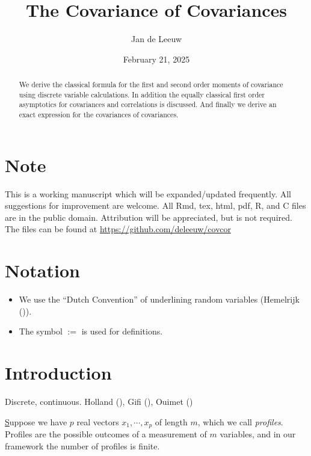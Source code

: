 \documentclass[
  12pt,
  letterpaper,
  DIV=11,
  numbers=noendperiod]{scrartcl}
\title{The Covariance of Covariances}
\author{Jan de Leeuw}
\date{February 21, 2025}
\providecommand{\tightlist}{%
  \setlength{\itemsep}{0pt}\setlength{\parskip}{0pt}}\usepackage{longtable,booktabs,array}
\newcommand{\sectionbreak}{\clearpage}
\newcommand{\ul}[1]{\underline{#1}}
\renewcommand*\contentsname{Table of contents}
\newcommand\contentsname{Table of contents}
\begin{document}
\maketitle
\begin{abstract}
We derive the classical formula for the first and second order moments
of covariance using discrete variable calculations. In addition the
equally classical first order asymptotics for covariances and
correlations is discussed. And finally we derive an exact expression for
the covariances of covariances.
\end{abstract}

\renewcommand*\contentsname{Table of contents}
{
\hypersetup{linkcolor=}
\setcounter{tocdepth}{3}
\tableofcontents
}

\section*{Note}\label{note}

This is a working manuscript which will be expanded/updated frequently.
All suggestions for improvement are welcome. All Rmd, tex, html, pdf, R,
and C files are in the public domain. Attribution will be appreciated,
but is not required. The files can be found at
\url{https://github.com/deleeuw/covcor}

\section*{Notation}\label{notation}

\begin{itemize}
\tightlist
\item
  We use the ``Dutch Convention'' of underlining random variables
  (Hemelrijk ()).
\item
  The symbol \(:=\) is used for definitions.
\end{itemize}

\sectionbreak

\section{Introduction}\label{introduction}

Discrete, continuous. Holland (), Gifi
(), Ouimet
()

\ul
Suppose we have \(p\) real vectors \(x_1,\cdots,x_p\) of length \(m\),
which we call \emph{profiles}. Profiles are the possible outcomes of a
measurement of \(m\) variables, and in our framework the number of
profiles is finite.
\end{document}
